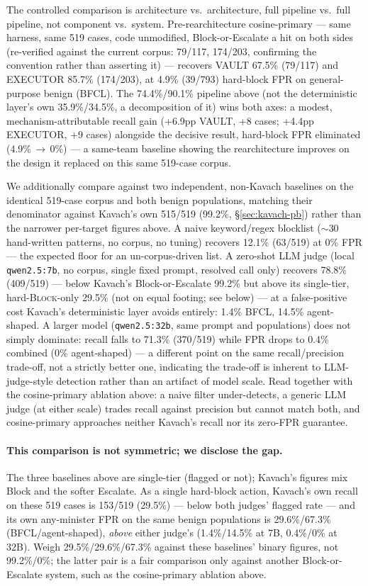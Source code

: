 The controlled comparison is architecture vs.\ architecture, full
pipeline vs.\ full pipeline, not component vs.\ system. Pre-rearchitecture
cosine-primary --- same harness, same 519 cases, code unmodified,
Block-or-Escalate a hit on both sides (re-verified against the current
corpus: 79/117, 174/203, confirming the convention rather than asserting
it) --- recovers VAULT 67.5\% (79/117) and EXECUTOR 85.7\% (174/203), at
4.9\% (39/793) hard-block FPR on general-purpose benign (BFCL). The
74.4\%/90.1\% pipeline above (not the deterministic layer's own
35.9\%/34.5\%, a decomposition of it) wins both axes: a modest,
mechanism-attributable recall gain (+6.9pp VAULT, +8 cases; +4.4pp
EXECUTOR, +9 cases) alongside the decisive result, hard-block FPR
eliminated (4.9\%\,$\to$\,0\%) --- a same-team baseline showing the
rearchitecture improves on the design it replaced on this same 519-case
corpus.

We additionally compare against two independent, non-Kavach baselines on
the identical 519-case corpus and both benign populations, matching their
denominator against Kavach's own 515/519 (99.2\%, \S\ref{sec:kavach-pb})
rather than the narrower per-target figures above. A naive keyword/regex
blocklist ($\sim$30 hand-written patterns, no corpus, no tuning) recovers
12.1\% (63/519) at 0\% FPR --- the expected floor for an un-corpus-driven
list. A zero-shot LLM judge (local \texttt{qwen2.5:7b}, no corpus, single
fixed prompt, resolved call only) recovers 78.8\% (409/519) --- below
Kavach's Block-or-Escalate 99.2\% but above its single-tier,
hard-\textsc{Block}-only 29.5\% (not on equal footing; see below) --- at
a false-positive cost Kavach's deterministic layer avoids entirely: 1.4\%
BFCL, 14.5\% agent-shaped.
A larger model (\texttt{qwen2.5:32b}, same
prompt and populations) does not simply dominate: recall falls to 71.3\%
(370/519) while FPR drops to 0.4\% combined (0\% agent-shaped) --- a
different point on the same recall/precision trade-off, not a strictly
better one, indicating the trade-off is inherent to LLM-judge-style
detection rather than an artifact of model scale. Read together with the
cosine-primary ablation above: a naive filter under-detects, a generic LLM
judge (at either scale) trades recall against precision but cannot match
both, and cosine-primary approaches neither Kavach's recall nor its
zero-FPR guarantee.

\paragraph{This comparison is not symmetric; we disclose the gap.} The
three baselines above are single-tier (flagged or not); Kavach's figures
mix Block and the softer Escalate. As a single hard-block action, Kavach's
own recall on these 519 cases is 153/519 (29.5\%) --- below both judges'
flagged rate --- and its own any-minister FPR on the same benign
populations is 29.6\%/67.3\% (BFCL/agent-shaped), \emph{above} either
judge's (1.4\%/14.5\% at 7B, 0.4\%/0\% at 32B). Weigh 29.5\%/29.6\%/67.3\%
against these baselines' binary figures, not 99.2\%/0\%; the latter pair
is a fair comparison only against another Block-or-Escalate system, such
as the cosine-primary ablation above.

